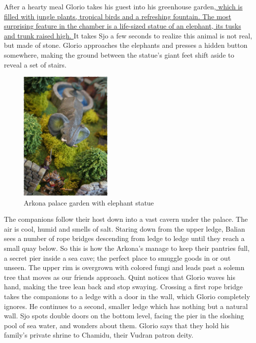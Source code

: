 After a hearty meal Glorio takes his guest into his greenhouse garden,\hyperref[fig:Arkona-palace-garden-with-elephant-statue-563929835]{ which is filled with jungle plants, tropical birds and a refreshing fountain. The most surprising feature in the chamber is a life-sized statue of an elephant, its tusks and trunk raised high. } It takes Sjo a few seconds to realize this animal is not real, but made of stone. Glorio approaches the elephants and presses a hidden button somewhere, making the ground between the statue's giant feet shift aside to reveal a set of stairs. \\

\begin{figure}[h]
	\centering
	\includegraphics[width=0.4\textwidth]{images/Arkona-palace-garden-with-elephant-statue-563929835_mod.jpg}
	\caption{Arkona palace garden with elephant statue}
	\label{fig:Arkona-palace-garden-with-elephant-statue-563929835}
\end{figure}

The companions follow their host down into a vast cavern under the palace. The air is cool, humid and smells of salt. Staring down from the upper ledge, Balian sees a number of rope bridges descending from ledge to ledge until they reach a small quay below. So this is how the Arkona's manage to keep their pantries full, a secret pier inside a sea cave; the perfect place to smuggle goods in or out unseen. The upper rim is overgrown with colored fungi and leads past a solemn tree that moves as our friends approach. Quint notices that Glorio waves his hand, making the tree lean back and stop swaying. Crossing a first rope bridge takes the companions to a ledge with a door in the wall, which Glorio completely ignores. He continues to a second, smaller ledge which has nothing but a natural wall. Sjo spots double doors on the bottom level, facing the pier in the sloshing pool of sea water, and wonders about them. Glorio says that they hold his family's private shrine to Chamidu, their Vudran patron deity.\\

